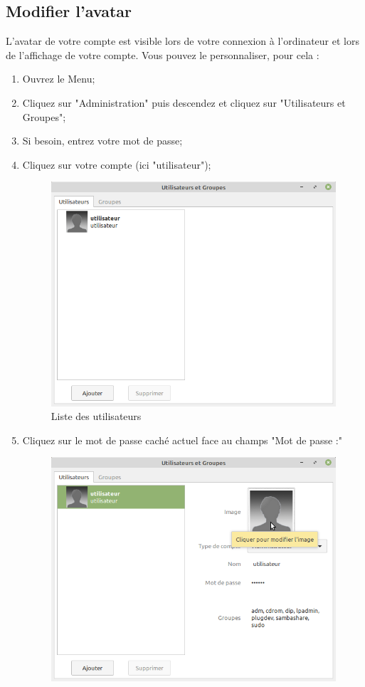 \documentclass[12pt]{book}
\begin{document}
	\subsection{Modifier l'avatar}
		L'avatar de votre compte est visible lors de votre connexion à l'ordinateur et lors de l'affichage de votre compte.
		Vous pouvez le personnaliser, pour cela :
		\begin{enumerate}
			\item Ouvrez le Menu;
			\item Cliquez sur "Administration" puis descendez et cliquez sur "Utilisateurs et Groupes";
			\item Si besoin, entrez votre mot de passe;
			\item Cliquez sur votre compte (ici "utilisateur");
			\begin{figure}[h]
				\centering
				\includegraphics[width=\textwidth]{include/users.png}
				\caption{Liste des utilisateurs}
				\label{fig:mdpuser}
			\end{figure}
			\item Cliquez sur le mot de passe caché actuel face au champs "Mot de passe :"
			\begin{figure}[h]
				\centering
				\includegraphics[width=\textwidth]{include/avataruser.png}

\end{figure}
\end{enumerate}
\end{document}
